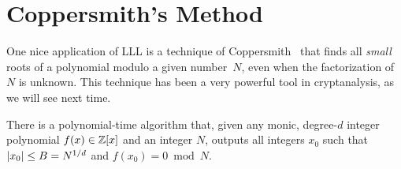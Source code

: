 \documentclass[11pt]{article}
\begin{document}
\section{Coppersmith's Method}
\label{sec:coppersmiths-method}

One nice application of LLL is a technique of
Coppersmith~\cite{DBLP:conf/eurocrypt/Coppersmith96} that finds all
\emph{small} roots of a polynomial modulo a given number~$N$, even
when the factorization of $N$ is unknown. This technique has been a
very powerful tool in cryptanalysis, as we will see next time.

\begin{theorem}
  \label{thm:coppersmith}
  There is a polynomial-time algorithm that, given any monic,
  degree-$d$ integer polynomial $f(x) \in \mathbb{Z}[x]$ and an integer $N$,
  outputs all integers $x_{0}$ such that
  $\lvert x_{0}\rvert \leq B = N^{1/d}$ and $f(x_{0}) = 0 \bmod N$.
\end{theorem}
\end{document}
